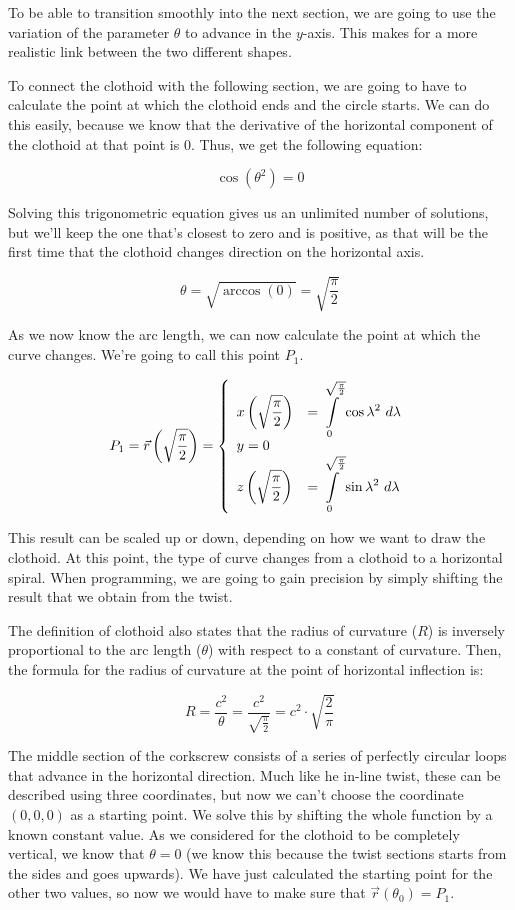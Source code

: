 \documentclass[12pt,twoside,a4paper]{article}
\newcommand{\ds}{\displaystyle}
\begin{document}
	To be able to transition smoothly into the next section, we are going to use the variation of the parameter $\theta$ to advance in the $y$-axis. This makes for a more realistic link between the two different shapes.
	
	To connect the clothoid with the following section, we are going to have to calculate the point at which the clothoid ends and the circle starts. We can do this easily, because we know that the derivative of the horizontal component of the clothoid at that point is $0$. Thus, we get the following equation:
	
	$$\cos(\theta^2) = 0$$
	
	Solving this trigonometric equation gives us an unlimited number of solutions, but we'll keep the one that's closest to zero and is positive, as that will be the first time that the clothoid changes direction on the horizontal axis.
	
	$$\theta = \sqrt{\arccos(0)} = \sqrt{\frac{\pi}{2}}$$
	
	As we now know the arc length, we can now calculate the point at which the curve changes. We're going to call this point $P_1$.
	
	$$P_1 = \vec{r}\left(\sqrt{\frac{\pi}{2}}\right) = \left\{\begin{array}{ll} \ds x\left(\sqrt{\frac{\pi}{2}}\right) &= \ds \intop_0^{\sqrt{\frac{\pi}{2}}}{\cos{\lambda^2}} \ d\lambda \cr y = 0 \cr \ds z\left(\sqrt{\frac{\pi}{2}}\right) &= \ds \intop_0^{\sqrt{\frac{\pi}{2}}}{\sin{\lambda^2}} \ d\lambda \end {array}\right.$$
	
	This result can be scaled up or down, depending on how we want to draw the clothoid. At this point, the type of curve changes from a clothoid to a horizontal spiral. When programming, we are going to gain precision by simply shifting the result that we obtain from the twist.
	
	The definition of clothoid also states that the radius of curvature ($R$) is inversely proportional to the arc length ($\theta$) with respect to a constant of curvature. Then, the formula for the radius of curvature at the point of horizontal inflection is:
	
	$$R = \frac{c^2}{\theta} = \frac{c^2}{\ds \sqrt{\frac{\pi}{2}}} = c^2 \cdot \sqrt{\frac{2}{\pi}}$$
	
	The middle section of the corkscrew consists of a series of perfectly circular loops that advance in the horizontal direction. Much like he in-line twist, these can be described using three coordinates, but now we can't choose the coordinate $(0, 0, 0)$ as a starting point. We solve this by shifting the whole function by a known constant value. As we considered for the clothoid to be completely vertical, we know that $\theta = 0$ (we know this because the twist sections starts from the sides and goes upwards). We have just calculated the starting point for the other two values, so now we would have to make sure that $\vec{r}(\theta_0) = P_1$.
	
\end{document}
